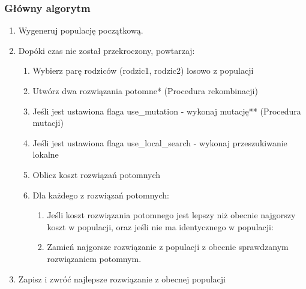 \documentclass[11pt]{article}
\begin{document}
\subsubsection{Główny algorytm}
\begin{enumerate}
    \item Wygeneruj populację początkową.
    \item Dopóki czas nie został przekroczony, powtarzaj:
    \begin{enumerate}
        \item Wybierz parę rodziców (rodzic1, rodzic2) losowo z populacji
        \item Utwórz dwa rozwiązania potomne* (Procedura rekombinacji)
        \item Jeśli jest ustawiona flaga use\_mutation - wykonaj mutację** (Procedura mutacji)
        \item Jeśli jest ustawiona flaga use\_local\_search - wykonaj przeszukiwanie lokalne
        \item Oblicz koszt rozwiązań potomnych
        \item Dla każdego z rozwiązań potomnych:
        \begin{enumerate}
            \item Jeśli koszt rozwiązania potomnego jest lepszy niż obecnie najgorszy koszt w populacji, oraz jeśli nie ma identycznego w populacji:
            \item Zamień najgorsze rozwiązanie z populacji z obecnie sprawdzanym rozwiązaniem potomnym.
        \end{enumerate}
    \end{enumerate}
    \item Zapisz i zwróć najlepsze rozwiązanie z obecnej populacji
\end{enumerate}
\end{document}
